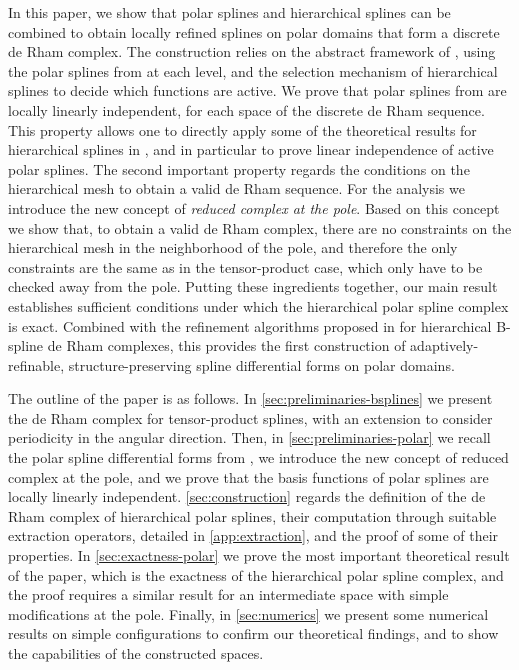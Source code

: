 \documentclass[10pt]{article}
\theoremstyle{plain}
\theoremstyle{definition}
\theoremstyle{remark}
\begin{document}
In this paper, we show that polar splines and hierarchical splines can be combined to
obtain locally refined splines on polar domains that form a discrete de Rham
complex.
The construction relies on the abstract framework of \cite{Giannelli:2014}, using the polar splines from \cite{Toshniwal:2021} at each level, and the selection mechanism of hierarchical splines to decide which functions are active. We prove that polar splines from \cite{Toshniwal:2021} are locally linearly independent, for each space of the discrete de Rham sequence. This property allows one to directly apply some of the theoretical results for hierarchical splines in \cite{Giannelli:2014}, and in particular to prove linear independence of active polar splines. The second important property regards the conditions on the hierarchical mesh to obtain a valid de Rham sequence. For the analysis we introduce the new concept of \emph{reduced complex at the pole}. Based on this concept we show that, to obtain a valid de Rham complex, there are no constraints on the hierarchical mesh in the neighborhood of the pole, and therefore the only constraints are the same as in the tensor-product case, which only have to be checked away from the pole.
Putting these ingredients together, our main result establishes sufficient conditions under which the hierarchical polar spline complex is exact.
Combined with the refinement algorithms proposed in \cite{Cabanas:2025,Dijkstra:2026} for hierarchical B-spline de Rham complexes, this provides the first construction of adaptively-refinable, structure-preserving spline differential forms on polar domains.

The outline of the paper is as follows. In \cref{sec:preliminaries-bsplines} we present the de Rham complex for tensor-product splines, with an extension to consider periodicity in the angular direction. Then, in \cref{sec:preliminaries-polar} we recall  the polar spline differential forms from \cite{Toshniwal:2021}, we introduce the new concept of reduced complex at the pole, and we prove that the basis functions of polar splines are locally linearly independent. \cref{sec:construction} regards the definition of the de Rham complex of hierarchical polar splines, their computation through suitable extraction operators, detailed in \cref{app:extraction}, and the proof of some of their  properties. In \cref{sec:exactness-polar} we prove the most important theoretical result of the paper, which is the exactness of the hierarchical polar spline complex, and the proof requires a similar result for an intermediate space with simple modifications at the pole. Finally, in \cref{sec:numerics} we present some numerical results on simple configurations to confirm our theoretical findings, and to show the capabilities of the constructed spaces.
\end{document}
